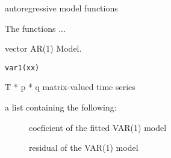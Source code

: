 \documentclass[a4paper]{book}
\begin{document}
%
\begin{Section}{autoregressive model functions}

The functions ...
\end{Section}
%
\begin{Description}\relax
vector AR(1) Model.
\end{Description}
%
\begin{Usage}
\begin{verbatim}
var1(xx)
\end{verbatim}
\end{Usage}
%
\begin{Arguments}
\begin{ldescription}
\item[\code{xx}] T * p * q matrix-valued time series
\end{ldescription}
\end{Arguments}
%
\begin{Value}
a list containing the following:\begin{description}

\item[] coeficient of the fitted VAR(1) model
\item[] residual of the VAR(1) model

\end{description}

\end{Value}
%
\begin{Examples}
\end{Examples}
\printindex{}
\end{document}
